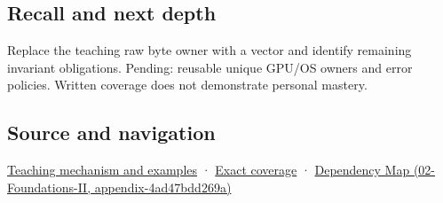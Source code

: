 \subsection{Recall and next depth}\label{recall-and-next-depth}

Replace the teaching raw byte owner with a vector and identify remaining invariant obligations. Pending: reusable unique GPU/OS owners and error policies. Written coverage does not demonstrate personal mastery.

\subsection{Source and navigation}\label{source-and-navigation}

\href{Continuous\%20Notes/Computing\%20Foundations\%20-\%20From\%20Bits\%20to\%20C++\%20and\%20Systems\%20APIs\#From\%20three\%20repairs\%20to\%20five\%20decisions\%20to\%20zero\%20boilerplate}{Teaching mechanism and examples} · \hyperref[appendix-fd090d982a15]{Exact coverage} · \href{}{Dependency Map (02-Foundations-II, appendix-4ad47bdd269a)}
